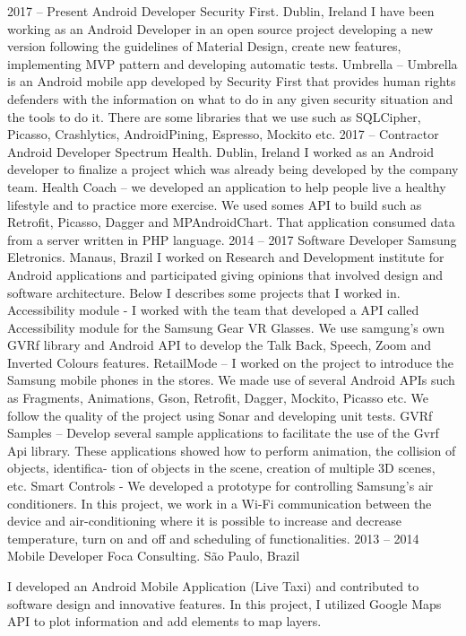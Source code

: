 \documentclass[9pt]{developercv} %
\begin{document}
\begin{entrylist}
	\entry
		{2017 -- Present}
		{Android Developer}
		{Security First. Dublin, Ireland}
		{I have been working as an Android Developer in an open source project developing a new version following the guidelines of Material Design, create new features, implementing MVP pattern and developing automatic tests.
\newline
\newline
Umbrella – Umbrella is an Android mobile app developed by Security First that provides human rights defenders with the information on what to do in any given security situation and the tools to do it. There are some libraries that we use such as SQLCipher, Picasso, Crashlytics, AndroidPining, Espresso, Mockito etc.
}
	\entry
		{2017 -- Contractor}
		{Android Developer}
		{Spectrum Health. Dublin, Ireland}
		{I worked as an Android developer to finalize a project which was already being developed by the company team.
\newline
\newline
Health Coach – we developed an application to help people live a healthy lifestyle and to practice more exercise. We used somes API to build such as Retrofit, Picasso, Dagger and MPAndroidChart. That application consumed data from a server written in PHP language.}
	\entry
		{2014 -- 2017}
		{Software Developer}
		{Samsung Eletronics. Manaus, Brazil}
		{I worked on Research and Development institute for Android applications and participated giving opinions that involved design and software architecture. Below I describes some projects that I worked in.
\newline
\newline
Accessibility module - I worked with the team that developed a API called Accessibility module for the Samsung Gear VR Glasses. We use samgung’s own GVRf library and Android API to develop the Talk Back, Speech, Zoom and Inverted Colours features.
\newline
\newline
RetailMode – I worked on the project to introduce the Samsung mobile phones in the stores. We made use of several Android APIs such as Fragments, Animations, Gson, Retrofit, Dagger, Mockito, Picasso etc. We follow the quality of the project using Sonar and developing unit tests.
GVRf Samples – Develop several sample applications to facilitate the use of the Gvrf Api library. These applications showed how to perform animation, the collision of objects, identifica- tion of objects in the scene, creation of multiple 3D scenes, etc.
\newline
\newline
Smart Controls - We developed a prototype for controlling Samsung’s air conditioners. In this project, we work in a Wi-Fi communication between the device and air-conditioning where it is possible to increase and decrease temperature, turn on and off and scheduling of functionalities.}
	\entry
		{2013 -- 2014}
		{Mobile Developer}
		{Foca Consulting. São Paulo, Brazil}
		{I developed an Android Mobile Application (Live Taxi) and contributed to software design and innovative features. In this project, I utilized Google Maps API to plot information and add elements to map layers.

}
\end{entrylist}
\end{document}
